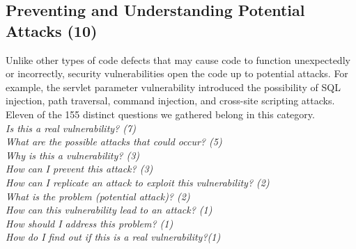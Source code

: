 \documentclass[conference]{IEEEtran}
\begin{document}








\noindent\subsection{\textbf{Preventing and Understanding Potential Attacks (10)}}\label{pupa}
Unlike other types of code defects that may cause code to function unexpectedly or incorrectly, security vulnerabilities open the code up to potential attacks. For example, the servlet parameter vulnerability introduced the possibility of SQL injection, path traversal, command injection, and cross-site scripting attacks.
Eleven of the 155 distinct questions we gathered belong in this category.
\\

\noindent\emph{Is this a real vulnerability? (7)} \\
\emph{What are the possible attacks that could occur? (5)} \\
\emph{Why is this a vulnerability? (3)} \\
\emph{How can I prevent this attack? (3)} \\
\emph{How can I replicate an attack to exploit this vulnerability? (2)} \\
\emph{What is the problem (potential attack)? (2)} \\
\emph{How can this vulnerability lead to an attack? (1)} \\
\emph{How should I address this problem? (1)} \\
\emph{How do I find out if this is a real vulnerability?(1)} \\
\end{document}
